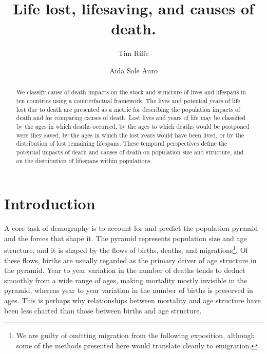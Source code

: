 \documentclass{article}
\begin{document}
\title{Life lost, lifesaving, and causes of death.}

\author[1]{Tim Riffe}
\author[2]{A{\"i}da Sole Auro}

\maketitle

%
\begin{abstract}
We classify cause of death impacts on the stock and structure of lives and
lifespans in ten countries using a counterfactual framework. The lives and potential years
of life lost due to death are presented as a metric for describing the population impacts of death and for comparing causes of
death. Lost lives and years of life may be classified by the ages in which
deaths occurred, by the ages to which deaths would be postponed were they saved, by the
ages in which the lost years would have been lived, or by the distribution of
lost remaining lifespans. These temporal perspectives define the
potential impacts of death and causes of death on population size and structure,
and on the distribution of lifespans within populations. 
\end{abstract}

%
\section*{Introduction}
A core task of demography is to account for and predict the population
pyramid and the forces that shape it. The pyramid represents population
size and age structure, and it is shaped by the flows of births,
deaths, and migrations\footnote{We are guilty of omitting migration from
the following exposition, although some of the methods presented here would
translate cleanly to emigration.}. Of these flows, births are usually regarded as the primary driver of age structure in the pyramid. Year to year variation in the
number of deaths tends to deduct smoothly from a wide range of ages,
making mortality mostly invisible in the pyramid, whereas year to year variation
in the number of births is preserved in ages. This is perhaps why 
relationships between mortality and age structure have been less charted than
those between births and age structure. 
\end{document}
